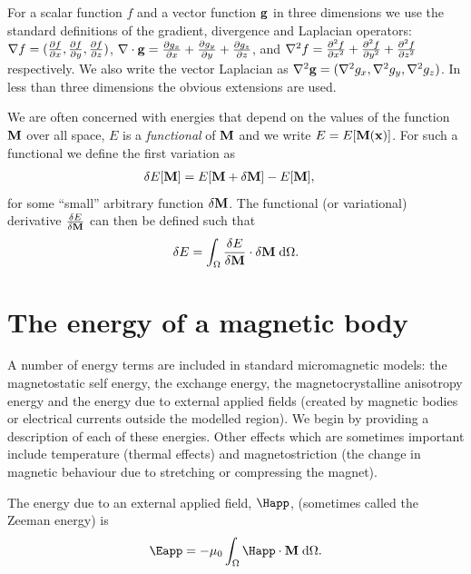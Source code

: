 For a scalar function $f$ and a vector function ${\boldsymbol{\mathrm{g}}}$ in three dimensions we use the standard definitions of the gradient, divergence and Laplacian operators: $\nabla f = (\frac{\partial f}{\partial x}, \frac{\partial f}{\partial y}, \frac{\partial f}{\partial z})$, $\nabla \cdot {\boldsymbol{\mathrm{g}}} = \frac{\partial g_x}{\partial x} + \frac{\partial g_y}{\partial y} + \frac{\partial g_z}{\partial z}$, and $\nabla^2 f = \frac{\partial^2 f}{\partial {x}^2} + \frac{\partial^2 f}{\partial {y}^2} + \frac{\partial^2 f}{\partial {z}^2}$ respectively.
We also write the vector Laplacian as $\nabla^2 {\boldsymbol{\mathrm{g}}} = (\nabla^2 g_x,\nabla^2 g_y, \nabla^2 g_z )$.
In less than three dimensions the obvious extensions are used.


We are often concerned with energies that depend on the values of the function $\boldsymbol{\mathrm{M}}$ over all space, \ie $E$ is a \emph{functional} of $\boldsymbol{\mathrm{M}}$ and we write $E = E[\boldsymbol{\mathrm{M}}(\boldsymbol{\mathrm{x}})]$.
For such a functional we define the first variation as
\begin{equation}
  \begin{aligned}
    \delta E[\boldsymbol{\mathrm{M}}] &= E[\boldsymbol{\mathrm{M}} + \delta\boldsymbol{\mathrm{M}}] - E[\boldsymbol{\mathrm{M}}],
  \end{aligned}
\end{equation}
for some ``small'' arbitrary function $\delta\boldsymbol{\mathrm{M}}$.
The functional (or variational) derivative $\frac{\delta E}{\delta \boldsymbol{\mathrm{M}}}$ can then be defined such that
\begin{equation}
  \delta E  = {\int_{\Omega} {\frac{\delta E}{\delta \boldsymbol{\mathrm{M}}} \cdot \delta \boldsymbol{\mathrm{M}}} {\; \mathrm{{d}}} {\Omega}}.
  \label{eq:106}
\end{equation}


\section{The energy of a magnetic body}
\label{sec:energy-magnetic-body}

A number of energy terms are included in standard micromagnetic models: the magnetostatic self energy, the exchange energy, the magnetocrystalline anisotropy energy and the energy due to external applied fields (created by magnetic bodies or electrical currents outside the modelled region).
We begin by providing a description of each of these energies.
Other effects which are sometimes important include temperature (thermal effects) and magnetostriction (the change in magnetic behaviour due to stretching or compressing the magnet).

The energy due to an external applied field, $\Happ$, (sometimes called the Zeeman energy) is
\begin{equation}
  \label{eq:42}
  \Eapp = - \mu_0 \int_{\magd}  \Happ \cdot \Mv \d \magd.
\end{equation}

